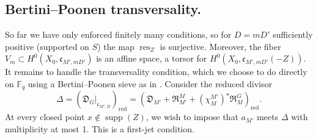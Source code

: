 \documentclass[openany]{amsbook}
\theoremstyle{definition}
\theoremstyle{remark}
\numberwithin{equation}{section}
\newcommand{\F}{\mathbb{F}}
\newcommand{\red}{\mathrm{red}}
\renewcommand{\-}{\operatorname{-}}
\newcommand{\res}{\operatorname{res}}
\newcommand{\on}[1]{\operatorname{#1}}
\newcommand{\fc}{\mathfrak{c}}
\newcommand{\fD}{\mathfrak{D}}
\newcommand{\fR}{\mathfrak{R}}
\begin{document}
\subsection{Bertini--Poonen transversality.}

So far we have only enforced finitely many conditions, so for $D = mD'$ sufficiently positive (supported on $S$) the map $\res_Z$ is surjective. Moreover, the fiber $V_m \subset H^0(X_0, \fc_{M',mD'})$ is an affine space, a torsor for $H^0(X_0, \fc_{M', mD'}(-Z))$. It remains to handle the transversality condition, which we choose to do directly on $\F_q$ using a Bertini--Poonen sieve as in \cite{poonenbertini}. Consider the reduced divisor
$$
    \Delta = (\fD_G|_{\fc_{M',D}})_{\red} = \left(\fD_{M'} + \fR_{M'}^M + (\chi_M^{M'})^\star \fR_M^G \right)_{\red}.
$$
At every closed point $x \not\in \on{supp}(Z)$, we wish to impose that $a_{M'}$ meets $\Delta$ with multiplicity at most 1. This is a first-jet condition.
\end{document}
